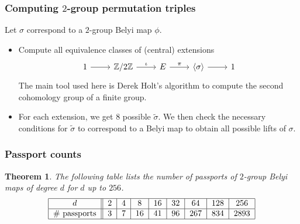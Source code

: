 \documentclass[handout, xcolor=dvipsnames]{beamer}
\theoremstyle{plain}
\newtheorem*{thm}{Theorem}
\newcommand{\Z}{\mathbb{Z}}
\newcommand{\wt}[1]{\widetilde{#1}}
\begin{document}
  \begin{frame}[plain]
    \frametitle{Computing $2$-group permutation triples}
    Let $\sigma$ correspond to a $2$-group Belyi map $\phi$.
    \begin{itemize}
      \item
        \pause
        \par
        Compute all equivalence classes of (central) extensions
        \[
          \begin{tikzcd}[ampersand replacement=\&, row sep = small]
            1\arrow{r}\&\Z/2\Z\arrow{r}{\iota}\&E\arrow{r}{\pi}\&\langle\sigma\rangle\arrow{r}\&1
          \end{tikzcd}
        \]
        The main tool used here is Derek Holt's
        algorithm to compute the second cohomology group
        of a finite group.
      \item
        \par
        \pause
        For each extension, we get $8$ possible $\wt{\sigma}$.
        We then check the necessary conditions for $\wt{\sigma}$ to
        correspond to a Belyi map to obtain all possible lifts of $\sigma$.
    \end{itemize}
  \end{frame}
  \begin{frame}[plain]
    \frametitle{Passport counts}
    \begin{thm}
      The following table lists the number of passports of
      $2$-group Belyi maps of degree $d$ for $d$ up to $256$.
      \[
        \begin{tabular}{|c||c|c|c|c|c|c|c|c|}
          \hline
          $d$ & $2$ & $4$ & $8$ & $16$ & $32$ & $64$ & $128$ & $256$\\
          \hline
          \# passports & $3$ & $7$ & $16$ & $41$ & $96$ & $267$ & $834$ & $2893$\\
          \hline
        \end{tabular}
      \]
    \end{thm}
  \end{frame}
\end{document}
